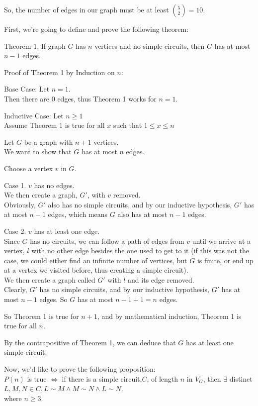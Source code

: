\documentclass[fleqn]{article}
\begin{document}
So, the number of edges in our graph must be at least ${5 \choose 2} = 10$.

First, we're going to define and prove the following theorem:

Theorem 1.
If graph $G$ has $n$ vertices and no simple circuits,
then $G$ has at most $n-1$ edges.

Proof of Theorem 1 by Induction on $n$:

Base Case: Let $n = 1$.\\
Then there are 0 edges, thus Theorem 1 works for $n=1$.

Inductive Case: Let $n \geq 1$\\
Assume Theorem 1 is true for all $x$ such that $1 \leq x \leq n$

Let $G$ be a graph with $n+1$ vertices.\\
We want to show that $G$ has at most $n$ edges.

Choose a vertex $v$ in $G$.

Case 1. $v$ has no edges.\\
We then create a graph, $G'$, with $v$ removed.\\
Obviously, $G'$ also has no simple circuits, and by our inductive hypothesis, $G'$ has at most $n-1$ edges, which means $G$ also has at most $n-1$ edges.

Case 2. $v$ has at least one edge.\\
Since $G$ has no circuits, we can follow a path of edges from $v$ until we arrive at a vertex, $l$ with no other edge besides the one used to get to it (if this was not the case, we could either find an infinite number of vertices, but $G$ is finite, or end up at a vertex we visited before, thus creating a simple circuit).\\
We then create a graph called $G'$ with $l$ and its edge removed.
\\Clearly, $G'$ has no simple circuits, and by our inductive hypothesis, $G'$ has at most $n-1$ edges. So $G$ has at most $n-1+1=n$ edges.


So Theorem 1 is true for $n+1$, and by mathematical induction, Theorem 1 is true for all $n$.
 
By the contrapositive of Theorem 1, we can deduce that $G$ has at least one simple circuit.

Now, we'd like to prove the following proposition:\\
$P(n)$ is true $\Leftrightarrow$ if there is a simple circuit,$C$, of length $n$ in $V_G$, then $\exists$ distinct $ L,M,N \in C,
                        L \sim M \wedge M \sim N \wedge L \sim N$.\\
where $n \geq 3$.
\end{document}
